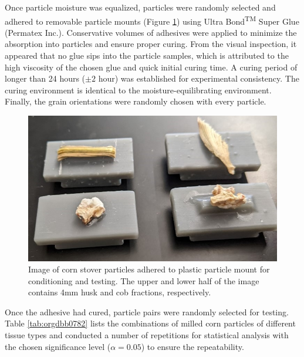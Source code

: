 \documentclass[xcolor=dvipsnames,10pt,hidelinks]{article}
\begin{document}
Once particle moisture was equalized, particles were randomly selected and adhered to removable particle mounts (Figure \ref{fig:org851024d}) using Ultra Bond\textsuperscript{TM} Super Glue (Permatex Inc.).
Conservative volumes of adhesives were applied to minimize the absorption into particles and ensure proper curing.
From the visual inspection, it appeared that no glue sips into the particle samples,
which is attributed to the high viscosity of the chosen glue and quick initial curing time.
A curing period of longer than 24 hours (\(\pm 2\) hour) was established for experimental consistency.
The curing environment is identical to the moisture-equilibrating environment.
Finally, the grain orientations were randomly chosen with every particle.

\begin{figure}[htbp]
\centering
\includegraphics[width=.9\linewidth]{figures/image4.jpg}
\caption{\label{fig:org851024d}Image of corn stover particles adhered to plastic particle mount for conditioning and testing. The upper and lower half of the image contains 4mm husk and cob fractions, respectively.}
\end{figure}

Once the adhesive had cured, particle pairs were randomly selected for testing.
Table \ref{tab:orgdbb0782} lists the combinations of milled corn particles of different tissue types and conducted a number of repetitions for statistical analysis with the chosen significance level (\(\alpha = 0.05\)) to ensure the repeatability.
\end{document}
